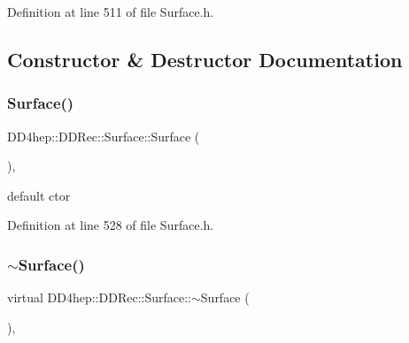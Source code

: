 Definition at line 511 of file Surface.\+h.



\subsection{Constructor \& Destructor Documentation}
\hypertarget{class_d_d4hep_1_1_d_d_rec_1_1_surface_a9cbdd49c7183347839f20c80c114f0b6}{}\label{class_d_d4hep_1_1_d_d_rec_1_1_surface_a9cbdd49c7183347839f20c80c114f0b6} 
\subsubsection{\texorpdfstring{Surface()}{Surface()}\hspace{0.1cm}{\footnotesize\ttfamily [1/2]}}
{\footnotesize\ttfamily D\+D4hep\+::\+D\+D\+Rec\+::\+Surface\+::\+Surface (\begin{DoxyParamCaption}{ }\end{DoxyParamCaption})\hspace{0.3cm}{\ttfamily [inline]}, {\ttfamily [protected]}}



default c\textquotesingle{}tor 



Definition at line 528 of file Surface.\+h.

\hypertarget{class_d_d4hep_1_1_d_d_rec_1_1_surface_aa336356bfc2c272c65b7fae46688dad5}{}\label{class_d_d4hep_1_1_d_d_rec_1_1_surface_aa336356bfc2c272c65b7fae46688dad5} 
\subsubsection{\texorpdfstring{$\sim$\+Surface()}{~Surface()}}
{\footnotesize\ttfamily virtual D\+D4hep\+::\+D\+D\+Rec\+::\+Surface\+::$\sim$\+Surface (\begin{DoxyParamCaption}{ }\end{DoxyParamCaption})\hspace{0.3cm}{\ttfamily [inline]}, {\ttfamily [virtual]}}



